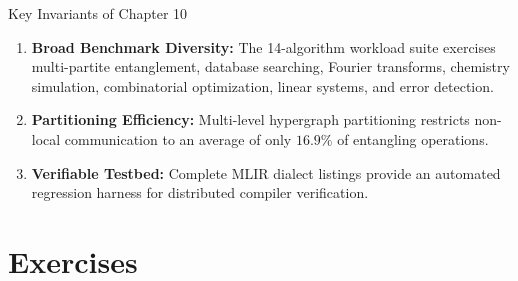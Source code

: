 
\begin{summarybox}{Key Invariants of Chapter 10}
\begin{enumerate}
    \item \textbf{Broad Benchmark Diversity:} The 14-algorithm workload suite exercises multi-partite entanglement, database searching, Fourier transforms, chemistry simulation, combinatorial optimization, linear systems, and error detection.
    \item \textbf{Partitioning Efficiency:} Multi-level hypergraph partitioning restricts non-local communication to an average of only $16.9\%$ of entangling operations.
    \item \textbf{Verifiable Testbed:} Complete MLIR dialect listings provide an automated regression harness for distributed compiler verification.
\end{enumerate}
\end{summarybox}


\section*{Exercises}

